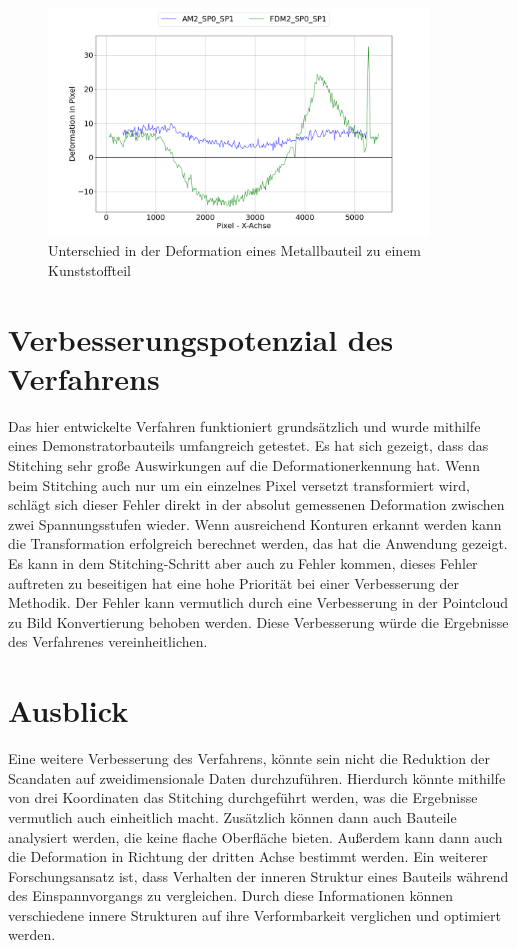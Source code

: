 \begin{figure}[H]
    \centering
    \includegraphics[width=0.9\textwidth]{images/am_fdm.png}
    \caption{Unterschied in der Deformation eines Metallbauteil zu einem
    Kunststoffteil}
    \label{fig:am_fdm_compare}
\end{figure}


\section{Verbesserungspotenzial des Verfahrens}

Das hier entwickelte Verfahren funktioniert grundsätzlich und wurde mithilfe 
eines Demonstratorbauteils umfangreich getestet. Es hat sich gezeigt, dass 
das Stitching sehr große Auswirkungen auf die Deformationerkennung hat. 
Wenn beim Stitching auch nur um ein einzelnes Pixel versetzt transformiert wird,
schlägt sich dieser Fehler direkt in der absolut gemessenen 
Deformation zwischen zwei Spannungsstufen wieder.
Wenn ausreichend Konturen erkannt werden kann die Transformation erfolgreich
berechnet werden, das hat die Anwendung gezeigt. Es kann in dem Stitching-Schritt
aber auch zu Fehler kommen, dieses Fehler auftreten zu beseitigen hat eine hohe Priorität 
bei einer Verbesserung der Methodik. 
Der Fehler kann vermutlich durch eine Verbesserung in der Pointcloud zu Bild 
Konvertierung behoben werden. Diese Verbesserung würde die Ergebnisse 
des Verfahrenes vereinheitlichen. 

\section{Ausblick}

Eine weitere Verbesserung des Verfahrens, könnte sein nicht die Reduktion der 
Scandaten auf zweidimensionale Daten durchzuführen. 
Hierdurch könnte mithilfe von drei Koordinaten das Stitching durchgeführt werden, 
was die Ergebnisse vermutlich auch einheitlich macht. Zusätzlich können 
dann auch Bauteile analysiert werden, die keine flache Oberfläche bieten.
Außerdem kann dann auch die Deformation in Richtung der dritten Achse bestimmt werden. 
Ein weiterer Forschungsansatz ist, dass Verhalten der inneren Struktur eines Bauteils 
während des Einspannvorgangs zu vergleichen. Durch diese Informationen können 
verschiedene innere Strukturen auf ihre Verformbarkeit verglichen und optimiert werden. 

